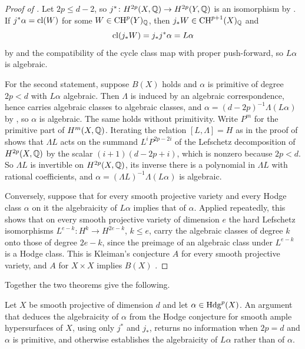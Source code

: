\begin{proof}[Proof of ]
Let $2p\le d-2$, so $j^{*}\colon H^{2p}(X,\mathbb{Q})\to H^{2p}(Y,\mathbb{Q})$ is an
isomorphism by . If $j^{*}\alpha=\mathrm{cl}(W)$ for some
$W\in\operatorname{CH}^{p}(Y)_{\mathbb{Q}}$, then $j_{*}W\in\operatorname{CH}^{p+1}(X)_{\mathbb{Q}}$ and
\[
  \mathrm{cl}(j_{*}W)=j_{*}j^{*}\alpha=L\alpha
\]
by  and the compatibility of the cycle class map with
proper push-forward, so $L\alpha$ is algebraic.

For the second statement, suppose $B(X)$ holds and $\alpha$ is primitive of
degree $2p<d$ with $L\alpha$ algebraic. Then $\Lambda$ is induced by an algebraic correspondence, hence
carries algebraic classes to algebraic classes, and
$\alpha=(d-2p)^{-1}\Lambda(L\alpha)$ by , so $\alpha$ is
algebraic. The same holds without primitivity. Write $P^{m}$ for the
primitive part of $H^{m}(X,\mathbb{Q})$. Iterating the relation $[L,\Lambda]=H$ as in
the proof of  shows that $\Lambda L$ acts on the summand
$L^{i}P^{2p-2i}$ of the Lefschetz decomposition of $H^{2p}(X,\mathbb{Q})$ by the
scalar $(i+1)(d-2p+i)$, which is nonzero because $2p<d$. So $\Lambda L$ is
invertible on $H^{2p}(X,\mathbb{Q})$, its inverse there is a polynomial in
$\Lambda L$ with rational coefficients, and
$\alpha=(\Lambda L)^{-1}\Lambda(L\alpha)$ is algebraic.

Conversely, suppose that for every smooth projective variety and every Hodge
class $\alpha$ on it the algebraicity of $L\alpha$ implies that of $\alpha$.
Applied repeatedly, this shows that on every smooth projective variety of
dimension $e$ the hard Lefschetz isomorphisms
$L^{e-k}\colon H^{k}\to H^{2e-k}$, $k\le e$, carry the algebraic classes of
degree $k$ onto those of degree $2e-k$, since the preimage of an algebraic
class under $L^{e-k}$ is a Hodge class. This is Kleiman's conjecture $A$ for
every smooth projective variety, and $A$ for $X\times X$ implies $B(X)$
\cite{Kle68,Kle94}.
\end{proof}

Together the two theorems give the following.

\begin{corollary}%
\label{cor:noinduction}
Let $X$ be smooth projective of dimension $d$ and let $\alpha\in\mathrm{Hdg}^{p}(X)$.
An argument that deduces the algebraicity of $\alpha$ from the Hodge
conjecture for smooth ample hypersurfaces of $X$, using only $j^{*}$ and
$j_{*}$, returns no information when $2p=d$ and $\alpha$ is primitive, and
otherwise establishes the algebraicity of $L\alpha$ rather than of $\alpha$.
\end{corollary}

